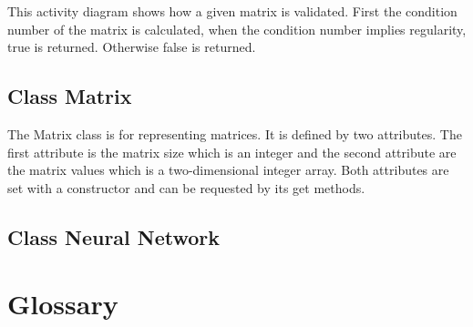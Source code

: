 \documentclass[parskip=full]{scrartcl}
\begin{document}
This activity diagram shows how a given matrix is validated. First the condition number of the matrix is calculated, when the condition number implies regularity, true is returned. Otherwise false is returned.

\subsection{Class Matrix}
The Matrix class is for representing matrices. It is defined by two attributes. The first attribute is the matrix size which is an integer and the second attribute are the matrix values which is a two-dimensional integer array. Both attributes are set with a constructor and can be requested by its get methods.

\subsection{Class Neural Network}


\newpage
\section{Glossary}

%
\printnoidxglossaries
\end{document}

